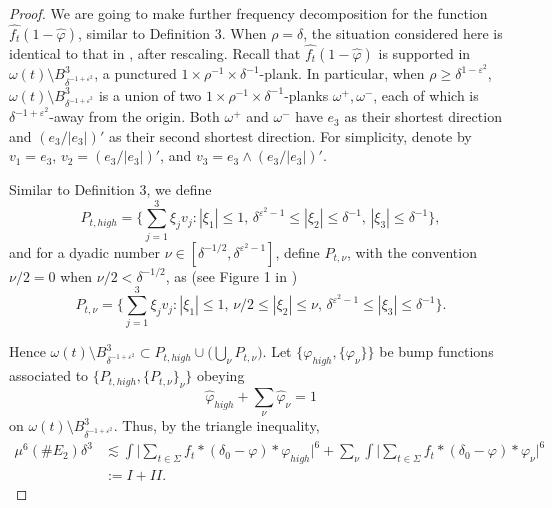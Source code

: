 \documentclass{amsart}%
\numberwithin{equation}{section}
\newcommand{\de}{\delta}
\newcommand{\e}{\varepsilon}
\newcommand{\Si}{\Sigma}
\newcommand{\vp}{\varphi}
\newcommand{\om}{\omega}
\newcommand{\wh}{\widehat}
\newcommand{\1}{\mathbbm{1}}
\begin{document}
\begin{proof}
We are going to make further frequency decomposition for the function $\wh{f_t}(1-\wh\vp)$, similar to \cite{GGGHMW} Definition 3. 
When $\rho=\de$, the situation considered here is identical to that in \cite{GGGHMW}, after rescaling.
Recall that $\wh{f_t}(1-\wh\vp)$ is supported in $\om(t)\setminus B^3_{\de^{-1+\e^2}}$, a punctured $1\times\rho^{-1}\times\de^{-1}$-plank.
In particular, when $\rho\geq\de^{1-\e^2}$, $\om(t)\setminus B^3_{\de^{-1+\e^2}}$ is a union of two $1\times\rho^{-1}\times\de^{-1}$-planks $\om^+, \om^-$, each of which is $\de^{-1+\e^2}$-away from the origin. 
Both $\om^+$ and $\om^-$ have $e_3$ as their shortest direction and $(e_3/|e_3|)'$ as their second shortest direction. 
For simplicity, denote by $v_1=e_3$, $v_2=(e_3/|e_3|)'$, and $v_3=e_3\wedge (e_3/|e_3|)'$. 

\smallskip

Similar to \cite{GGGHMW} Definition 3, we define
\begin{equation}
    P_{t,high}=\{\sum_{j=1}^3\xi_jv_j:|\xi_1|\leq1,\,\de^{\e^2-1}\leq|\xi_2|\leq\de^{-1},\,  |\xi_3|\leq\de^{-1}\},
\end{equation}
and for a dyadic number $\nu\in[\de^{-1/2}, \de^{\e^2-1}]$, define $P_{t,\nu}$, with the convention $\nu/2=0$ when $\nu/2<\de^{-1/2}$,  as (see Figure 1 in \cite{GGGHMW})
\begin{equation}
    P_{t,\nu}=\{\sum_{j=1}^3\xi_jv_j:|\xi_1|\leq1,\,\nu/2\leq|\xi_2|\leq\nu,\, \de^{\e^2-1}\leq|\xi_3|\leq\de^{-1}\}. 
\end{equation}

Hence $\om(t)\setminus B^3_{\de^{-1+\e^2}}\subset P_{t,high}\cup\big(\bigcup_{\nu}P_{t,\nu}\big)$. 
Let $\{\vp_{high},\{\vp_\nu\}\}$ be bump functions associated to $\{P_{t,high},\{P_{t,\nu}\}_\nu\}$ obeying
\begin{equation}
    \wh\vp_{high}+\sum_\nu\wh\vp_\nu=1
\end{equation}
on $\om(t)\setminus B^3_{\de^{-1+\e^2}}$. Thus, by the triangle inequality, 
\begin{align}
\nonumber
    \mu^6(\#E_2)\de^3 &\lesssim\int\Big|\sum_{t\in\Si} f_t\ast(\delta_0-\vp)\ast\vp_{high}\Big|^6+\sum_\nu\int\Big|\sum_{t\in\Si} f_t\ast(\delta_0-\vp)\ast\vp_\nu\Big|^6\\
    \label{two-cases}
    &:=I+II.
\end{align}



\end{proof}
\end{document}
